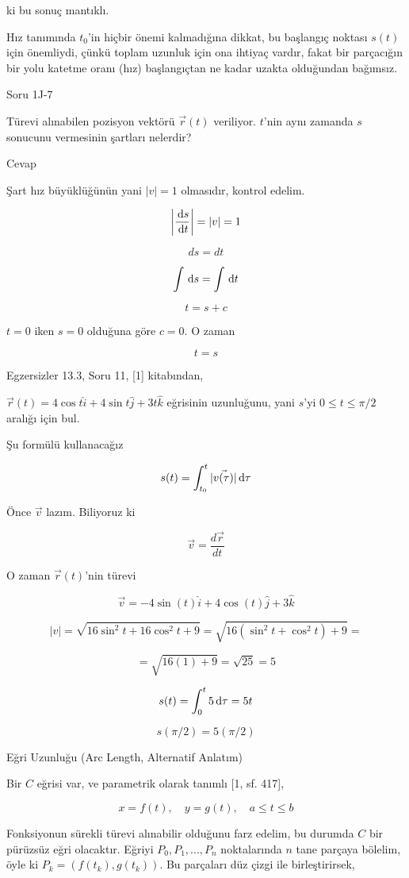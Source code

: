 \documentclass[12pt,fleqn]{article}\usepackage{../../common}
\begin{document}
ki bu sonuç mantıklı. 

Hız tanımında $t_0$'in hiçbir önemi kalmadığına dikkat, bu başlangıç noktası
$s(t)$ için önemliydi, çünkü toplam uzunluk için ona ihtiyaç vardır, fakat bir
parçacığın bir yolu katetme oranı (hız) başlangıçtan ne kadar uzakta olduğundan
bağımsız.

Soru 1J-7

Türevi alınabilen pozisyon vektörü $\vec{r}(t)$ veriliyor. $t$'nin aynı zamanda
$s$ sonucunu vermesinin şartları nelerdir?

Cevap

Şart hız büyüklüğünün yani $|v|=1$ olmasıdır, kontrol edelim. 

$$ \bigg|\frac{\,\mathrm{d} s}{\,\mathrm{d} t}\bigg| = |v| = 1 $$

$$ ds = dt $$

$$ \int \,\mathrm{d} s = \int \,\mathrm{d} t $$

$$ t = s + c $$

$t=0$ iken $s=0$ olduğuna göre $c=0$. O zaman 

$$ t = s $$

Egzersizler 13.3, Soru 11, [1] kitabından,

$\vec{r}(t) = 4 \cos t \hat{i} + 4 \sin t \hat{j} + 3t \hat{k}$ 
eğrisinin uzunluğunu, yani $s$'yi  $ 0 \le t \le \pi / 2$ 
aralığı için bul. 

Şu formülü kullanacağız

$$ s(t) = \int_{t_0}^t |\vec{v(\tau)}| \,\mathrm{d}\tau  $$

Önce $\vec{v}$ lazım. Biliyoruz ki

$$ \vec{v} = \frac{d\vec{r}}{dt} $$

O zaman $\vec{r}(t)$'nin türevi

$$ \vec{v} = -4\sin(t)\hat{i} + 4\cos(t)\hat{j} + 3\hat{k} $$

$$ |v| = \sqrt{16\sin^2t + 16\cos^2t  + 9} = 
\sqrt{16(\sin^2t + \cos^2t) + 9} = 
 $$

$$ = \sqrt{16(1) + 9} = \sqrt{25} = 5 $$

$$ s(t) = \int_0^t 5 \,\mathrm{d} \tau = 
5t 
$$

$$ s(\pi / 2) = 5(\pi/2) $$

Eğri Uzunluğu (Arc Length, Alternatif Anlatım)

Bir $C$ eğrisi var, ve parametrik olarak tanımlı [1, sf. 417],

$$
x = f(t), \quad y = g(t), \quad a \le t \le b
$$

Fonksiyonun sürekli türevi alınabilir olduğunu farz edelim, bu durumda $C$ bir
pürüzsüz eğri olacaktır.  Eğriyi $P_0,P_1,...,P_n$ noktalarında $n$ tane parçaya
bölelim, öyle ki $P_k = (f(t_k),g(t_k))$. Bu parçaları düz çizgi ile
birleştirirsek,
\end{document}
